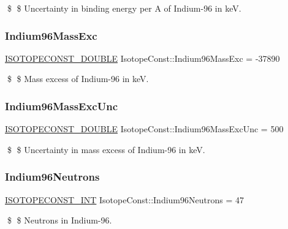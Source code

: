 \$ \$ Uncertainty in binding energy per A of Indium-\/96 in keV. \mbox{\label{group___isotope_const-_indium-_in96_ga2519fdf87e391ab7efd45fb2ea44fc0f}} 
\subsubsection{\texorpdfstring{Indium96\+Mass\+Exc}{Indium96MassExc}}
{\footnotesize\ttfamily \mbox{\hyperlink{group___isotope_const-_macros_ga8f45a7272ce02c0b4c65c44636ed719a}{I\+S\+O\+T\+O\+P\+E\+C\+O\+N\+S\+T\+\_\+\+D\+O\+U\+B\+LE}} Isotope\+Const\+::\+Indium96\+Mass\+Exc = -\/37890}

\$ \$ Mass excess of Indium-\/96 in keV. \mbox{\label{group___isotope_const-_indium-_in96_gae132300fa808ee8aa34257d4ee2560c3}} 
\subsubsection{\texorpdfstring{Indium96\+Mass\+Exc\+Unc}{Indium96MassExcUnc}}
{\footnotesize\ttfamily \mbox{\hyperlink{group___isotope_const-_macros_ga8f45a7272ce02c0b4c65c44636ed719a}{I\+S\+O\+T\+O\+P\+E\+C\+O\+N\+S\+T\+\_\+\+D\+O\+U\+B\+LE}} Isotope\+Const\+::\+Indium96\+Mass\+Exc\+Unc = 500}

\$ \$ Uncertainty in mass excess of Indium-\/96 in keV. \mbox{\label{group___isotope_const-_indium-_in96_ga38e41e12c51d76df1fffa0815197f401}} 
\subsubsection{\texorpdfstring{Indium96\+Neutrons}{Indium96Neutrons}}
{\footnotesize\ttfamily \mbox{\hyperlink{group___isotope_const-_macros_ga5f18360b3e99483a35c32d789e62621c}{I\+S\+O\+T\+O\+P\+E\+C\+O\+N\+S\+T\+\_\+\+I\+NT}} Isotope\+Const\+::\+Indium96\+Neutrons = 47}

\$ \$ Neutrons in Indium-\/96. \mbox{\label{group___isotope_const-_indium-_in96_gad983fd14b4eaa3d80995a60136e372a8}} 

